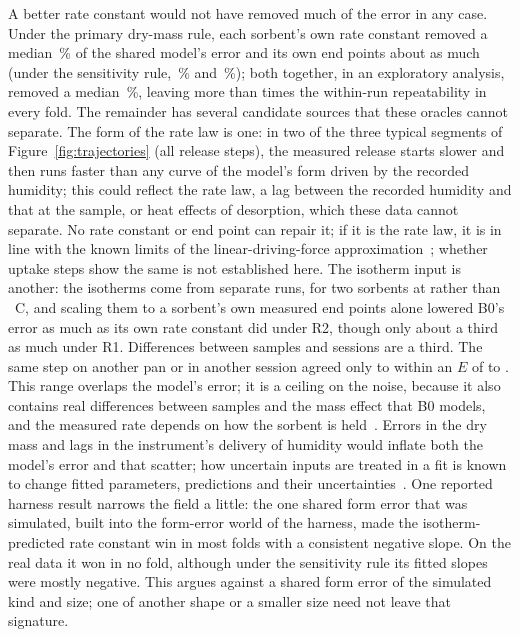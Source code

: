 \documentclass[12pt]{article}
\begin{document}
A better rate constant would not have removed much of the error in any case. Under the primary dry-mass rule, each
sorbent's own rate constant removed a median \,\% of the shared model's error and its own end points
about as much (under the sensitivity rule, \,\% and \,\%); both together, in an exploratory analysis, removed a median
\,\%, leaving more than  times the within-run repeatability in every fold. The
remainder has several candidate sources that these oracles cannot separate. The form of the rate law is one: in two
of the three typical segments of Figure~\ref{fig:trajectories} (all release steps), the measured release starts slower
and then runs faster than any curve of the model's form driven by the recorded humidity; this could reflect the
rate law, a lag between the recorded humidity and that at the sample, or heat effects of desorption, which these data
cannot separate. No rate constant or end point can repair it; if it is the rate law, it is in line with the known
limits of the linear-driving-force approximation~\cite{Raymond2011Intraparticle}; whether uptake steps show
the same is not established here. The isotherm input is another: the isotherms come from separate runs, for two
sorbents at  rather than ~\textdegree C, and scaling them to a sorbent's own measured end points alone
lowered B0's error as much as its own rate constant did under R2, though only about a third as much under R1. Differences between samples and sessions are a
third. The same step on another pan or in another session agreed only to within an $E$ of  to
. This range overlaps the model's error; it is a ceiling on the noise, because it also contains real
differences between samples and the mass effect that B0 models, and the measured rate depends on how the sorbent is
held~\cite{Solovyeva2023Water,Li2025Atmospheric}. Errors in the dry mass and lags in the instrument's delivery of
humidity would inflate both the model's error and that scatter; how uncertain inputs are treated in a fit is known to
change fitted parameters, predictions and their uncertainties~\cite{Abdi2023Parameter}. One reported harness result narrows the field a little: the one shared form error that was simulated, built into
the form-error world of the harness, made the isotherm-predicted rate constant win in most folds with a consistent
negative slope. On the real data it won in no fold, although under the sensitivity rule its fitted slopes were mostly
negative. This argues against a shared form error of the simulated kind and size; one of another shape or a smaller
size need not leave that signature.
\end{document}
